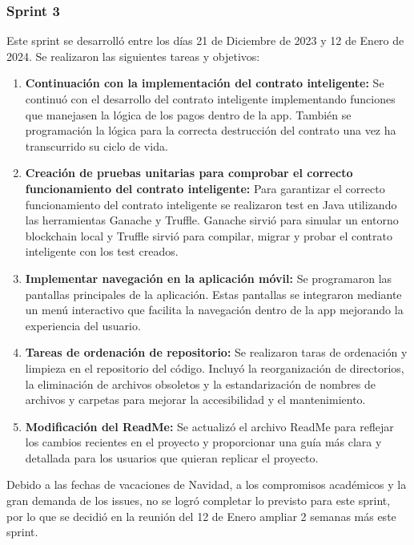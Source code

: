 \subsubsection{Sprint 3}

Este sprint se desarrolló entre los días 21 de Diciembre de 2023 y 12 de Enero de 2024. Se realizaron las siguientes tareas y objetivos:

\begin{enumerate}

\item \textbf{Continuación con la implementación del contrato inteligente:} Se continuó con el desarrollo del contrato inteligente implementando funciones que manejasen la lógica de los pagos dentro de la app. También se programación la lógica para la correcta destrucción del contrato una vez ha transcurrido su ciclo de vida.

\item \textbf{Creación de pruebas unitarias para comprobar el correcto funcionamiento del contrato inteligente:}  Para garantizar el correcto funcionamiento del contrato inteligente se realizaron test en Java utilizando las herramientas Ganache y Truffle.
Ganache sirvió para simular un entorno blockchain local y Truffle sirvió para compilar, migrar y probar el contrato inteligente con los test creados.

\item \textbf{Implementar navegación en la aplicación móvil:} Se programaron las pantallas principales de la aplicación. Estas pantallas se integraron mediante un menú interactivo que facilita la navegación dentro de la app mejorando la experiencia del usuario.

\item \textbf{Tareas de ordenación de repositorio:} Se realizaron taras de ordenación y limpieza en el repositorio del código. Incluyó la reorganización de directorios, la eliminación de archivos obsoletos y la estandarización de nombres de archivos y carpetas para mejorar la accesibilidad y el mantenimiento.

\item \textbf{Modificación del ReadMe:} Se actualizó el archivo ReadMe para reflejar los cambios recientes en el proyecto y proporcionar una guía más clara y detallada para los usuarios que quieran replicar el proyecto.

\end{enumerate}

Debido a las fechas de vacaciones de Navidad, a los compromisos académicos y la gran demanda de los issues, no se logró completar lo previsto para este sprint, por lo que se decidió en la reunión del 12 de Enero ampliar 2 semanas más este sprint.



